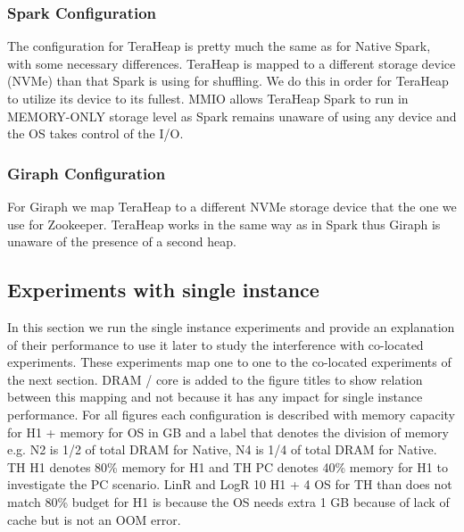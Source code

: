 \subsubsection{Spark Configuration}
The configuration for TeraHeap is pretty much the same as for Native
Spark, with some necessary differences. TeraHeap
is mapped to a different storage device (NVMe) than that Spark is
using for shuffling. We do this in order for TeraHeap to utilize its
device to its fullest. MMIO allows TeraHeap Spark to run in
MEMORY-ONLY storage level as Spark remains unaware of using any device and
the OS takes control of the I/O.

\subsubsection{Giraph Configuration}
For Giraph we map TeraHeap to a different NVMe storage device that the one we
use for Zookeeper. TeraHeap works in the same way as in Spark
thus Giraph is unaware of the presence of a second heap.

\subsection{Experiments with single instance}

In this section we run the single instance experiments and provide an explanation of their performance to use it later to study the interference with co-located experiments.
These experiments map one to one to the co-located experiments of the next section.
DRAM / core is added to the figure titles to show relation between this mapping and not because it has any impact
for single instance performance. For all figures each configuration is described with memory capacity for H1 + memory for OS in GB and a label that denotes the division of memory e.g. N2 is 1/2 of total DRAM for Native, N4 is 1/4 of total DRAM for Native. TH H1 denotes 80\% memory for H1 and TH PC denotes 40\% memory for H1 to investigate the PC scenario. LinR and LogR 10 H1 + 4 OS for TH than does not match 80\% budget for H1 is because the OS needs extra 1 GB because of lack of cache but is not an OOM error.


